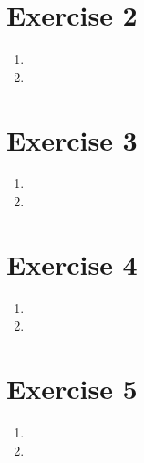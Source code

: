 \documentclass[12pt]{article}
\begin{document}
\section*{Exercise 2}
\begin{enumerate}[label=(\alph*)]
	\item
	\item
\end{enumerate}

\section*{Exercise 3}
\begin{enumerate}[label=(\alph*)]
	\item
	\item
\end{enumerate}

\section*{Exercise 4}
\begin{enumerate}[label=(\alph*)]
	\item
	\item
\end{enumerate}

\section*{Exercise 5}
\begin{enumerate}[label=(\alph*)]
	\item
	\item
\end{enumerate}
\end{document}
